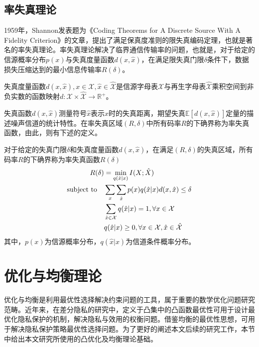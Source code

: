 \subsection{率失真理论}
1959年，Shannon发表题为《Coding Theorems for A Discrete Source With A Fidelity Criterion》\cite{Shannon1959Coding}的文章，提出了满足保真度准则的限失真编码定理，也就是著名的率失真理论。率失真理论解决了临界通信传输率的问题，也就是，对于给定的信源概率分布$p(x)$与失真度量函数$d(x,\hat{x})$，在满足限失真门限$\delta$条件下，数据损失压缩达到的最小信息传输率$R(\delta)$。
\begin{definition}
失真度量函数$d(x,\hat{x}),x\in \mathcal{X},\hat{x}\in \hat{\mathcal{X}}$是信源字母表$\mathcal{X}$与再生字母表$ \hat{\mathcal{X}}$乘积空间到非负实数的函数映射$d:\mathcal{X}\times \hat{\mathcal{X}}\rightarrow \mathbb{R}^{+}$。
\end{definition}
失真函数$d(x,\hat{x})$测量符号$\hat{x}$表示$x$时的失真距离，期望失真$\mathbb{E}[d(x,\hat{x})]$定量的描述噪声信道的统计特性。在率失真区域$(R,\delta)$中所有码率$R$的下确界称为率失真函数，由此，则有下述的定义。
\begin{definition}
	对于给定的失真门限$\delta$和失真度量函数$d(x,\hat{x})$，在满足$(R,\delta)$的失真区域，所有码率$R$的下确界称为率失真函数$R(\delta)$
	\begin{alignat}{2}
	R(\delta) & = \min_{q(\hat{x}|x)}I(X;\hat{X}) \nonumber \\
	  \mbox{\textup{subject to}}\quad 
      & \sum_{x}\sum_{\hat{x}}p(x)q(\hat{x}|x)d(x,\hat{x})\leq \delta\\
	  &  \sum_{\hat{x} \in \mathcal{X}}q(\hat{x}|x)=1, \forall x \in \mathcal{X}\\
	  &  q(\hat{x}|x) \geq 0, \forall x \in \mathcal{X}, \hat{x} \in \hat{\mathcal{X}}
	\end{alignat}
其中，$p(x)$为信源概率分布，$q(\hat{x}|x)$为信道条件概率分布。
\end{definition}

\section{优化与均衡理论}
优化与均衡是利用最优性选择解决约束问题的工具，属于重要的数学优化问题研究范畴。近年来，在差分隐私的研究中，定义于凸集中的凸函数最优性可用于设计最优化隐私保护的机制，解决隐私与效用的权衡问题。借鉴均衡的最优性思想，可用于解决隐私保护策略最优性选择问题。为了更好的阐述本文后续的研究工作，本节中给出本文研究所使用的凸优化及均衡理论基础。
